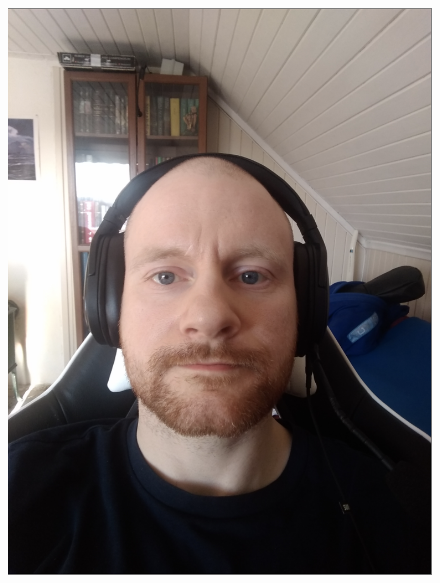 \begin{figure}[h]
\centering
    \subfloat
        {\includegraphics[scale = 0.2]{figures/0368.png}\hspace{1cm}}
    \subfloat

\end{figure}

